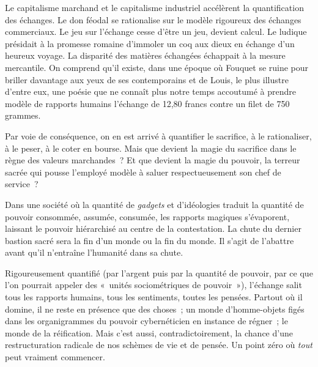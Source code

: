 \documentclass[french,twoside]{book} %
\newcommand{\astermono}{\medskip\centerline{\color{rubric}\large\selectfont{\syms ✻}}\medskip\par}%
\begin{document}
Le capitalisme marchand et le capitalisme industriel accélèrent la quantification des échanges. Le don féodal se rationalise sur le modèle rigoureux des échanges commerciaux. Le jeu sur l’échange cesse d’être un jeu, devient calcul. Le ludique présidait à la promesse romaine d’immoler un coq aux dieux en échange d’un heureux voyage. La disparité des matières échangées échappait à la mesure mercantile. On comprend qu’il existe, dans une époque où Fouquet se ruine pour briller davantage aux yeux de ses contemporains et de Louis, le plus illustre d’entre eux, une poésie que ne connaît plus notre temps accoutumé à prendre modèle de rapports humains l’échange de 12,80 francs contre un filet de 750 grammes.\par
Par voie de conséquence, on en est arrivé à quantifier le sacrifice, à le rationaliser, à le peser, à le coter en bourse. Mais que devient la magie du sacrifice dans le règne des valeurs marchandes ? Et que devient la magie du pouvoir, la terreur sacrée qui pousse l’employé modèle à saluer respectueusement son chef de service ?\par
Dans une société où la quantité de \emph{gadgets} et d’idéologies traduit la quantité de pouvoir consommée, assumée, consumée, les rapports magiques s’évaporent, laissant le pouvoir hiérarchisé au centre de la contestation. La chute du dernier bastion sacré sera la fin d’un monde ou la fin du monde. Il s’agit de l’abattre avant qu’il n’entraîne l’humanité dans sa chute.\par
Rigoureusement quantifié (par l’argent puis par la quantité de pouvoir, par ce que l’on pourrait appeler des « unités sociométriques de pouvoir »), l’échange salit tous les rapports humains, tous les sentiments, toutes les pensées. Partout où il domine, il ne reste en présence que des choses ; un monde d’homme-objets figés dans les organigrammes du pouvoir cybernéticien en instance de régner ; le monde de la réification. Mais c’est aussi, contradictoirement, la chance d’une restructuration radicale de nos schèmes de vie et de pensée. Un point zéro où \emph{tout} peut vraiment commencer.\par

\astermono
\end{document}
